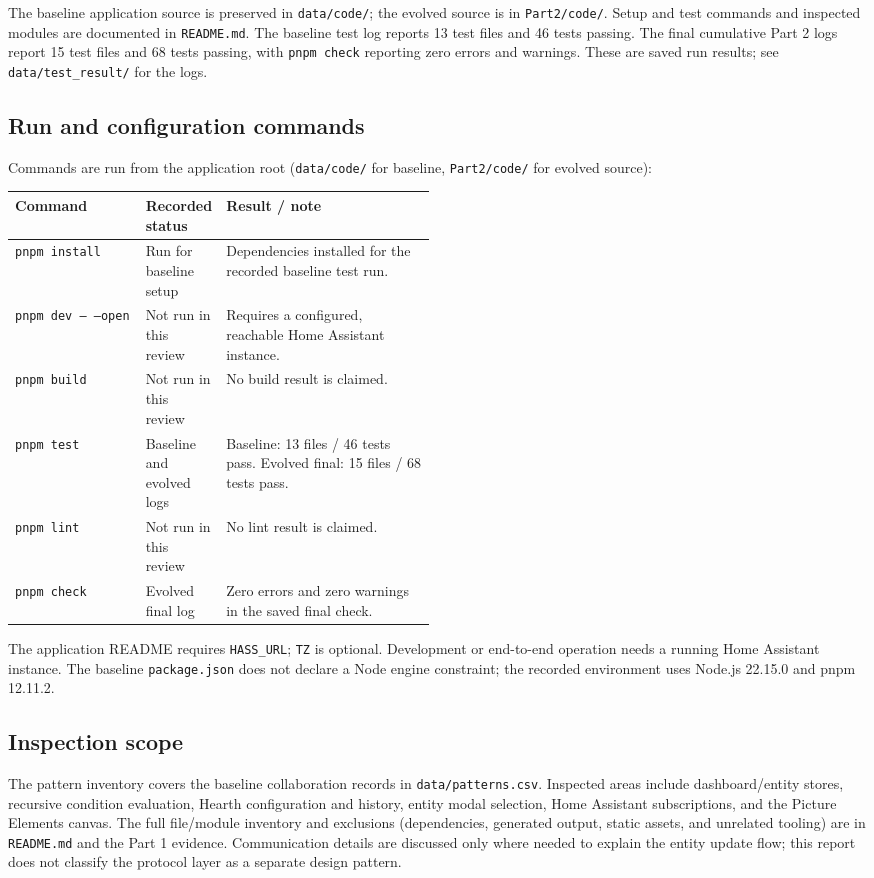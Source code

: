 \documentclass[11pt,a4paper]{article}
\newcommand{\code}[1]{\texttt{\small #1}}
\begin{document}
The baseline application source is preserved in \code{data/code/}; the evolved
source is in \code{Part2/code/}. Setup and test commands and inspected modules
are documented in \code{README.md}. The baseline test log reports 13 test files
and 46 tests passing. The final cumulative Part 2 logs report 15 test files and
68 tests passing, with \code{pnpm check} reporting zero errors and warnings.
These are saved run results; see \code{data/test\_result/} for the logs.

\subsection{Run and configuration commands}
Commands are run from the application root (\code{data/code/} for baseline,
\code{Part2/code/} for evolved source):
\begin{center}
\begin{tabularx}{\linewidth}{p{0.31\linewidth}p{0.18\linewidth}Y}
\toprule
Command & Recorded status & Result / note \\
\midrule
\code{pnpm install} & Run for baseline setup & Dependencies installed for the recorded baseline test run. \\
\code{pnpm dev -- --open} & Not run in this review & Requires a configured, reachable Home Assistant instance. \\
\code{pnpm build} & Not run in this review & No build result is claimed. \\
\code{pnpm test} & Baseline and evolved logs & Baseline: 13 files / 46 tests pass. Evolved final: 15 files / 68 tests pass. \\
\code{pnpm lint} & Not run in this review & No lint result is claimed. \\
\code{pnpm check} & Evolved final log & Zero errors and zero warnings in the saved final check. \\
\bottomrule
\end{tabularx}
\end{center}
The application README requires \code{HASS\_URL}; \code{TZ} is optional.
Development or end-to-end operation needs a running Home Assistant instance.
The baseline \code{package.json} does not declare a Node engine constraint;
the recorded environment uses Node.js 22.15.0 and pnpm 12.11.2.

\subsection{Inspection scope}
The pattern inventory covers the baseline collaboration records in
\code{data/patterns.csv}. Inspected areas include dashboard/entity stores,
recursive condition evaluation, Hearth configuration and history, entity modal
selection, Home Assistant subscriptions, and the Picture Elements canvas. The
full file/module inventory and exclusions (dependencies, generated output,
static assets, and unrelated tooling) are in \code{README.md} and the Part 1
evidence. Communication details are discussed only where needed to explain the
entity update flow; this report does not classify the protocol layer as a
separate design pattern.
\end{document}
